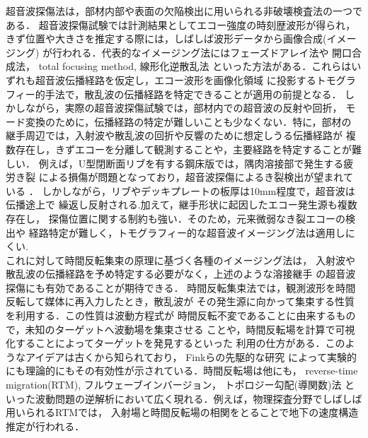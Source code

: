 ﻿超音波探傷法は，部材内部や表面の欠陥検出に用いられる非破壊検査法の一つである．
超音波探傷試験では計測結果としてエコー強度の時刻歴波形が得られ，
きず位置や大きさを推定する際には，しばしば波形データから画像合成(イメージング)
が行われる．代表的なイメージング法にはフェーズドアレイ法\cite{Wilcox2007}や
開口合成法\cite{Thomson1984, Doctor1986,Langenberg1986, Schmitz2000,Spies2012}，
total focusing method\cite{Holmes2008, Zhang2010}, 
線形化逆散乱法\cite{Langenberg1989, Kitahara2002, Shlivinski2007}
といった方法がある．これらはいずれも超音波伝播経路を仮定し，エコー波形を画像化領域
に投影するトモグラフィー的手法で，散乱波の伝播経路を特定できることが適用の前提となる．
%
しかしながら，実際の超音波探傷試験では，部材内での超音波の反射や回折，
モード変換のために，伝播経路の特定が難しいことも少なくない．特に，部材の
継手周辺では，入射波や散乱波の回折や反響のために想定しうる伝播経路が
複数存在し，きずエコーを分離して観測することや，主要経路を特定することが難しい．
例えば，U型閉断面リブを有する鋼床版では，隅肉溶接部で発生する疲労き裂
による損傷が問題となっており，超音波探傷によるき裂検出が望まれている
\cite{Urib3}．
しかしながら，リブやデッキプレートの板厚は10mm程度で，超音波は伝播途上で
繰返し反射される.加えて，継手形状に起因したエコー発生源も複数存在し，
探傷位置に関する制約も強い．そのため，元来微弱なき裂エコーの検出や
経路特定が難しく，トモグラフィー的な超音波イメージング法は適用しにくい.
\\
\hspace{\parindent}
これに対して時間反転集束の原理に基づく各種のイメージング法\cite{FinkTextBook}は，
入射波や散乱波の伝播経路を予め特定する必要がなく，上述のような溶接継手
の超音波探傷にも有効であることが期待できる．
時間反転集束法では，観測波形を時間反転して媒体に再入力したとき，散乱波が
その発生源に向かって集束する性質を利用する．この性質は波動方程式が
時間反転不変であることに由来するもので，未知のターゲットへ波動場を集束させる
ことや，時間反転場を計算で可視化することによってターゲットを発見するといった
利用の仕方がある．このようなアイデアは古くから知られており，
Finkらの先駆的な研究\cite{Fink1992, Prada1994, Prada1995, Prada1995_2,  Mordant1999}
によって実験的にも理論的にもその有効性が示されている．時間反転場は他にも，
reverse-time migration(RTM)\cite{Yan2008, Etgen2009, Velichko2010, Chung2012, Jones,KK_RTM}, 
フルウェーブインバージョン\cite{Fichtner, Talantola1984}，
トポロジー勾配(導関数)法\cite{Dominguez2005, Dominguez2010, Gibiat2010, Bonnet2008, Saitoh2021}
といった波動問題の逆解析において広く現れる．例えば，物理探査分野でしばしば用いられるRTMでは，
入射場と時間反転場の相関をとることで地下の速度構造推定が行われる． 

